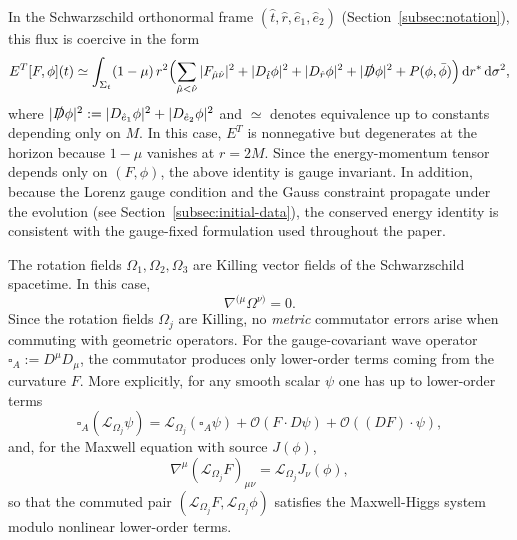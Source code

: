 \documentclass[11pt]{article}
\numberwithin{equation}{section}
\theoremstyle{plain}
\theoremstyle{definition}
\theoremstyle{remark}
\newcommand{\dd}{\mathrm{d}}
\begin{document}
In the Schwarzschild orthonormal frame $(\hat t,\hat r,\hat e_1,\hat e_2)$ (Section~\ref{subsec:notation}),
this flux is coercive in the form
\begin{equation}\label{eq:T-energy-coercive}
E^{T}[F,\phi](t)
\simeq
\int_{\Sigma_t}(1-\mu)\,r^{2}
\Bigl(
\sum_{\hat\mu<\hat\nu}|F_{\hat\mu\hat\nu}|^{2}
+
|D_{\hat t}\phi|^{2}+|D_{\hat r}\phi|^{2}
+
|\slashed D\phi|^{2}
+
P(\phi,\bar\phi)
\Bigr)\,\dd r^{\ast}\,\dd\sigma^{2},
\end{equation}
where $|\slashed D\phi|^{2}:=|D_{\hat e_1}\phi|^{2}+|D_{\hat e_2}\phi|^{2}$ and $\simeq$ denotes equivalence up to constants depending only on $M$.
In this case, $E^{T}$ is nonnegative but degenerates at the horizon because $1-\mu$ vanishes at $r=2M$.
Since the energy-momentum tensor depends only on $(F,\phi)$,
the above identity is gauge invariant.
In addition, because the Lorenz gauge condition and the Gauss constraint
propagate under the evolution (see Section~\ref{subsec:initial-data}),
the conserved energy identity is consistent with the gauge-fixed
formulation used throughout the paper.

The rotation fields $\Omega_1,\Omega_2,\Omega_3$ are Killing vector fields of the Schwarzschild spacetime.
In this case,
\begin{equation}
\nabla^{(\mu}\Omega^{\nu)}=0.
\end{equation}
Since the rotation fields $\Omega_j$ are Killing, no \emph{metric} commutator
errors arise when commuting with geometric operators. For the gauge-covariant wave operator $\square_A:=D^\mu D_\mu$, the commutator
produces only lower-order terms coming from the curvature $F$. More explicitly, for any smooth scalar $\psi$ one has up to lower-order terms
\begin{equation}\label{eq:commute-boxA}
\square_A(\mathcal{L}_{\Omega_j}\psi)
=
\mathcal{L}_{\Omega_j}(\square_A\psi)
+
\mathcal{O}\!\left(F\cdot D\psi\right)
+
\mathcal{O}\!\left((D F)\cdot \psi\right),
\end{equation}
and, for the Maxwell equation with source $J(\phi)$,
\begin{equation}\label{eq:commute-maxwell}
\nabla^\mu (\mathcal{L}_{\Omega_j}F)_{\mu\nu}
=
\mathcal{L}_{\Omega_j}J_\nu(\phi),
\end{equation}
so that the commuted pair $(\mathcal{L}_{\Omega_j}F,\mathcal{L}_{\Omega_j}\phi)$
satisfies the Maxwell-Higgs system modulo nonlinear lower-order terms.
\end{document}

